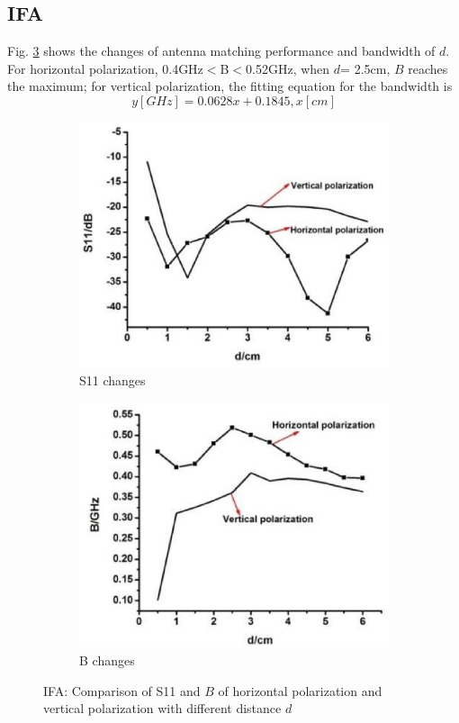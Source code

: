 \documentclass[journal]{IEEEtran}
\begin{document}
\subsection{IFA}
Fig. \ref{fig:5} shows the changes of antenna matching performance and bandwidth of $d$. For horizontal polarization,
0.4GHz$<$B$<$0.52GHz, when $d$= 2.5cm, $B$ reaches the maximum; for vertical polarization,
the fitting equation for the bandwidth is
\begin{equation}
\label{eq:eps_1}
y[GHz]=0.0628x+0.1845,   x[cm]
\end{equation}
\begin{figure}[!htb]
\centering
\begin{subfigure}[b]{0.4\textwidth}
\includegraphics[width=\textwidth]{figs/5a.eps}
\caption{S11 changes}
\label{fig:5a}	
\end{subfigure}		
\begin{subfigure}[b]{0.4\textwidth}
\includegraphics[width=\textwidth]{figs/5b.eps}
\caption{B changes}
\label{fig:5b}
\end{subfigure}
\caption{IFA: Comparison of S11 and $B$ of horizontal polarization and vertical polarization with different distance
$d$}
\label{fig:5}
\end{figure}
\end{document}
